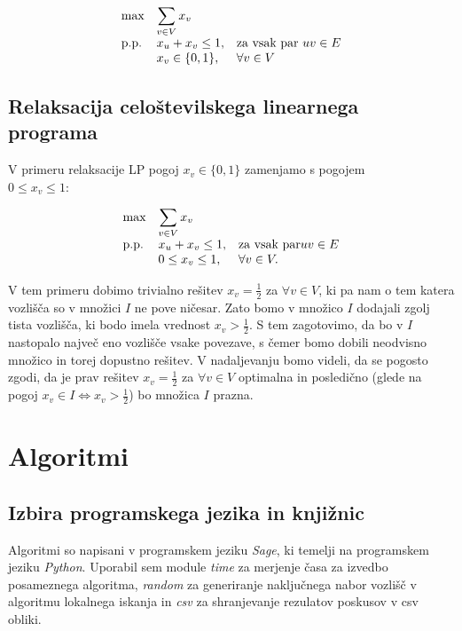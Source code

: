 \documentclass[a4paper, 12 pt]{article}
\theoremstyle{definition}
\theoremstyle{plain}
\theoremstyle{remark}
\begin{document}
\begin{equation*}
\begin{array}{ll@{}ll}
\text{max}  & \displaystyle\sum\limits_{v\in V} x_v &&\\
\text{p.p.}	 & x_u + x_v \leq 1,		 			&&\text{za vsak par } uv \in E \\
                 & x_v \in \{0,1\}, 	              			&&\forall v \in V
\end{array}
\end{equation*}




\subsection{Relaksacija celoštevilskega linearnega programa} \label{RCLP}
V primeru relaksacije LP pogoj $x_v \in \{0, 1\}$ zamenjamo s pogojem\\ $0 \leq x_v \leq 1$:

\begin{equation*}
\begin{array}{ll@{}ll}
\text{max}  	& \displaystyle\sum\limits_{v\in V} x_v &&\\
\text{p.p.}	& x_u + x_v \leq 1,		 				&&\text{za vsak par} uv \in E \\
                 	& 0 \leq x_v \leq 1, 	              			&&\forall v \in V.
\end{array}
\end{equation*}

V tem primeru dobimo trivialno rešitev $x_v = \frac{1}{2}$ za $\forall v \in V$, ki pa nam o tem katera vozlišča so v množici $I$ ne pove ničesar. Zato bomo v množico $I$ dodajali zgolj tista vozlišča, ki bodo imela vrednost $x_v > \frac{1}{2}$. S tem zagotovimo, da bo v $I$ nastopalo največ eno vozlišče vsake povezave, s čemer bomo dobili neodvisno množico in torej dopustno rešitev. V nadaljevanju bomo videli, da se pogosto zgodi, da je prav rešitev $x_v = \frac{1}{2}$ za $\forall v \in V$ optimalna in posledično (glede na pogoj $x_v \in I \iff x_v > \frac{1}{2}$) bo množica $I$ prazna.
 
\newpage
\section{Algoritmi} %
\subsection{Izbira programskega jezika in knjižnic}
Algoritmi so napisani v programskem jeziku \textit{Sage}, ki temelji na programskem jeziku \textit{Python}. Uporabil sem module \textit{time} za merjenje časa za izvedbo posameznega algoritma, \textit{random} za generiranje naključnega nabor vozlišč v algoritmu lokalnega iskanja in \textit{csv} za shranjevanje rezulatov poskusov v csv obliki.
\end{document}
